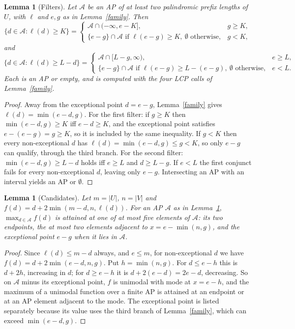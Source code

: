 ﻿\documentclass[11pt]{article}
\theoremstyle{plain}
\newtheorem{lemma}[theorem]{Lemma}
\theoremstyle{remark}
\begin{document}
\begin{lemma}[Filters]\label{filters}
Let $\mathcal A$ be an AP of at least two palindromic prefix lengths of $U$, with $\ell$ and $e,g$ as in Lemma~\ref{family}. Then
\[
\{d\in\mathcal A:\ell(d)\ge K\}=
\begin{cases}
\mathcal A\cap(-\infty,e-K],& g\ge K,\\
\{e-g\}\cap\mathcal A\text{ if }\ell(e-g)\ge K,\ \emptyset\text{ otherwise},& g<K,
\end{cases}
\]
and
\[
\{d\in\mathcal A:\ell(d)\ge L-d\}=
\begin{cases}
\mathcal A\cap[L-g,\infty),& e\ge L,\\
\{e-g\}\cap\mathcal A\text{ if }\ell(e-g)\ge L-(e-g),\ \emptyset\text{ otherwise},& e<L.
\end{cases}
\]
Each is an AP or empty, and is computed with the four LCP calls of Lemma~\ref{family}.
\end{lemma}
\begin{proof}
Away from the exceptional point $d=e-g$, Lemma~\ref{family} gives $\ell(d)=\min(e-d,g)$. For the first filter: if $g\ge K$ then $\min(e-d,g)\ge K$ iff $e-d\ge K$, and the exceptional point satisfies $e-(e-g)=g\ge K$, so it is included by the same inequality. If $g<K$ then every non-exceptional $d$ has $\ell(d)=\min(e-d,g)\le g<K$, so only $e-g$ can qualify, through the third branch. For the second filter: $\min(e-d,g)\ge L-d$ holds iff $e\ge L$ and $d\ge L-g$. If $e<L$ the first conjunct fails for every non-exceptional $d$, leaving only $e-g$. Intersecting an AP with an interval yields an AP or $\emptyset$.
\end{proof}

\begin{lemma}[Candidates]\label{five}
Let $m=|U|$, $n=|V|$ and $f(d)=d+2\min(m-d,n,\ell(d))$. For an AP $\mathcal A$ as in Lemma~\ref{filters}, $\max_{d\in\mathcal A}f(d)$ is attained at one of at most five elements of $\mathcal A$: its two endpoints, the at most two elements adjacent to $x=e-\min(n,g)$, and the exceptional point $e-g$ when it lies in $\mathcal A$.
\end{lemma}
\begin{proof}
Since $\ell(d)\le m-d$ always, and $e\le m$, for non-exceptional $d$ we have $f(d)=d+2\min(e-d,n,g)$. Put $h=\min(n,g)$. For $d\le e-h$ this is $d+2h$, increasing in $d$; for $d\ge e-h$ it is $d+2(e-d)=2e-d$, decreasing. So on $\mathcal A$ minus its exceptional point, $f$ is unimodal with mode at $x=e-h$, and the maximum of a unimodal function over a finite AP is attained at an endpoint or at an AP element adjacent to the mode. The exceptional point is listed separately because its value uses the third branch of Lemma~\ref{family}, which can exceed $\min(e-d,g)$.
\end{proof}
\end{document}
